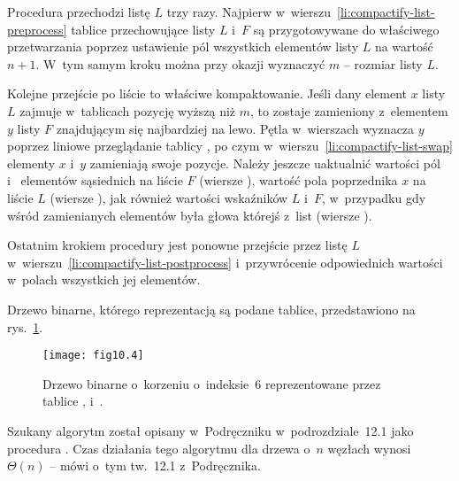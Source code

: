 Procedura przechodzi listę $L$ trzy razy. Najpierw w~wierszu~\ref{li:compactify-list-preprocess} tablice przechowujące listy $L$ i~$F$ są przygotowywane do właściwego przetwarzania poprzez ustawienie pól  wszystkich elementów listy $L$ na wartość $n+1$. W~tym samym kroku można przy okazji wyznaczyć $m$ -- rozmiar listy $L$.

Kolejne przejście po liście to właściwe kompaktowanie. Jeśli dany element $x$ listy $L$ zajmuje w~tablicach pozycję wyższą niż $m$, to zostaje zamieniony z~elementem $y$ listy $F$ znajdującym się najbardziej na lewo. Pętla  w~wierszach \twodashes{\ref{li:compactify-list-while2-begin}}{\ref{li:compactify-list-while2-end}} wyznacza $y$ poprzez liniowe przeglądanie tablicy , po czym w~wierszu~\ref{li:compactify-list-swap} elementy $x$ i~$y$ zamieniają swoje pozycje. Należy jeszcze uaktualnić wartości pól  i~ elementów sąsiednich na liście $F$ (wiersze \twodashes{\ref{li:compactify-list-fix-neighbors-begin}}{\ref{li:compactify-list-fix-neighbors-end}}), wartość pola  poprzednika $x$ na liście $L$ (wiersze \twodashes{\ref{li:compactify-list-fix-predecessor-begin}}{\ref{li:compactify-list-fix-predecessor-end}}), jak również wartości wskaźników $L$ i~$F$, w~przypadku gdy wśród zamienianych elementów była głowa którejś z~list (wiersze \twodashes{\ref{li:compactify-list-fix-heads-begin}}{\ref{li:compactify-list-fix-heads-end}}).

Ostatnim krokiem procedury jest ponowne przejście przez listę $L$ w~wierszu~\ref{li:compactify-list-postprocess} i~przywrócenie odpowiednich wartości w~polach  wszystkich jej elementów.


\exercise %
Drzewo binarne, którego reprezentacją są podane tablice, przedstawiono na rys.~\ref{fig:10.4-1}.
\begin{figure}[ht]
	\begin{center}
		\texttt{[image: fig10.4]}
	\end{center}
	\caption{Drzewo binarne o~korzeniu o~indeksie~6 reprezentowane przez tablice ,  i~.} \label{fig:10.4-1}
\end{figure}

\exercise %
Szukany algorytm został opisany w~Podręczniku w~podrozdziale~12.1 jako procedura . Czas działania tego algorytmu dla drzewa o~$n$ węzłach wynosi $\Theta(n)$ -- mówi o~tym tw.~12.1 z~Podręcznika.

